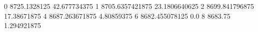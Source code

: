 0 8725.1328125 42.677734375
1 8705.6357421875 23.1806640625
2 8699.841796875 17.38671875
4 8687.263671875 4.80859375
6 8682.455078125 0.0
8 8683.75 1.294921875
